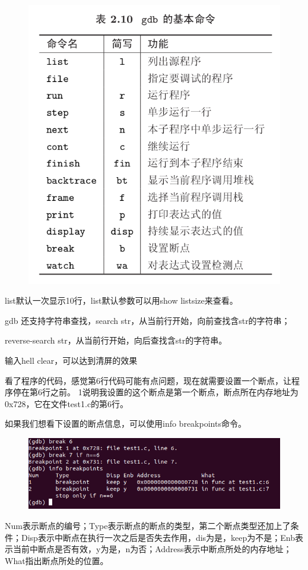 \documentclass[12pt,a4paper]{article}
\begin{document}
\begin{figure}[H]
\centering
\includegraphics[scale=0.5]{./figures/26.png}
\caption{}
\end{figure}
list默认一次显示10行，list默认参数可以用show listsize来查看。

gdb 还支持字符串查找，search str，从当前行开始，向前查找含str的字符串；

reverse-search str，从当前行开始，向后查找含str的字符串。

输入hell clear，可以达到清屏的效果

看了程序的代码，感觉第6行代码可能有点问题，现在就需要设置一个断点，让程序停在第6行之前。
1说明我设置的这个断点是第一个断点，断点所在内存地址为0x728，它在文件test1.c的第6行。

如果我们想看下设置的断点信息，可以使用info breakpoints命令。
\begin{figure}[H]
\centering
\includegraphics[scale=0.5]{./figures/27.png}
\caption{}
\end{figure}
Num表示断点的编号；Type表示断点的断点的类型，第二个断点类型还加上了条件；Disp表示中断点在执行一次之后是否失去作用，dis为是，keep为不是；Enb表示当前中断点是否有效，y为是，n为否；Address表示中断点所处的内存地址；What指出断点所处的位置。
\end{document}
